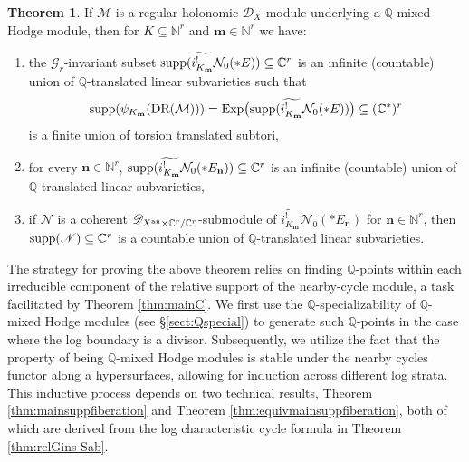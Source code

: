 \documentclass{amsart}
\theoremstyle{plain}
\numberwithin{theorem}{section}
\theoremstyle{definition}
\theoremstyle{remark}
\theoremstyle{definition}
\newtheorem{mainthm}{Theorem}
\newcommand{\wt}{\widetilde}
\newcommand{\C}{\mathbb{C}} %
\newcommand{\N}{\mathbb{N}}
\newcommand{\Q}{\mathbb{Q}}
\newcommand{\cM}{\mathcal{M}}
\newcommand{\cN}{\mathcal{N}}
\newcommand{\bn}{\mathbf{n}}
\newcommand{\bm}{\mathbf{m}}
\newcommand{\sN}{\mathscr{N}}
\newcommand{\sG}{\mathscr{G}}
\newcommand{\shD}{\mathscr{D}}
\newcommand{\DR}{\textup{DR}}
\newcommand{\an}{\textup{an}}
\newcommand{\supp}{\textup{supp}}
\begin{document}

\begin{mainthm}\label{thm:mainD}
If $\cM$ is a regular holonomic $\shD_X$-module underlying a $\Q$-mixed Hodge module, then for $K\subseteq \N^r$ and $\bm\in \N^r$ we have:
    \begin{enumerate}[label=$(\arabic*)$]
        \item the $\sG_r$-invariant subset $\supp(\wt{i^!_{K_\bm}}\cN_0(*E))\subseteq\C^r$ is an infinite (countable) union of $\Q$-translated linear subvarieties such that 
        \[\supp(\psi_{K_\bm}(\DR(\cM)))=\textup{Exp}\big(\supp(\wt{i^!_{K_\bm}}\cN_0(*E))\big)\subseteq (\C^*)^r\]
        is a finite union of torsion translated subtori,  
        \item for every $\bn\in \N^r$, $\supp(\wt{i^!_{K_\bm}}\cN_0(*E_\bn))\subseteq\C^r$ is an infinite (countable) union of $\Q$-translated linear subvarieties,
        \item if $\sN$ is a coherent $\shD_{X^\an\times \C^r/\C^r}$-submodule of $\wt{i^!_{K_\bm}}\cN_0(*E_\bn)$ for $\bn\in \N^r$, then $\supp(\sN)\subseteq \C^r$ is a countable union of $\Q$-translated linear subvarieties.
    \end{enumerate}
\end{mainthm}
The strategy for proving the above theorem relies on finding $\Q$-points within each irreducible component of the relative support of the nearby-cycle module, a task facilitated by Theorem \ref{thm:mainC}. We first use the $\Q$-specializability of $\Q$-mixed Hodge modules (see \S\ref{sect:Qspecial}) to generate such $\Q$-points in the case where the log boundary is a divisor. Subsequently, we utilize the fact that the property of being $\Q$-mixed Hodge modules is stable under the nearby cycles functor along a hypersurfaces, allowing for induction across different log strata.
This inductive process depends on two technical results, Theorem \ref{thm:mainsuppfiberation} and Theorem \ref{thm:equivmainsuppfiberation}, both of which are derived from the log characteristic cycle formula in Theorem \ref{thm:relGins-Sab}.   
\end{document}
